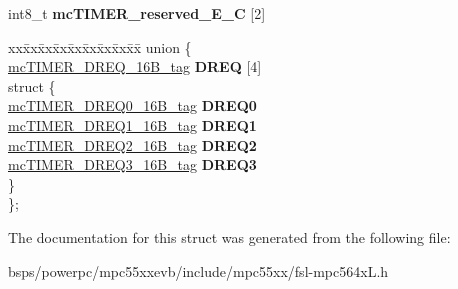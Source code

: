 \begin{DoxyCompactItemize}
\mbox{\label{structmcTIMER__struct__tag_a6c0588932173f1b5d96fb55863447152}} 
int8\+\_\+t {\bfseries mc\+T\+I\+M\+E\+R\+\_\+reserved\+\_\+E\+\_\+C} \mbox{[}2\mbox{]}
\item 
\mbox{\label{structmcTIMER__struct__tag_a896207dceb1e4c73c65fa0398d6e10de}} 
\begin{tabbing}
xx\=xx\=xx\=xx\=xx\=xx\=xx\=xx\=xx\=\kill
union \{\\
\>\mbox{\hyperlink{unionmcTIMER__DREQ__16B__tag}{mcTIMER\_DREQ\_16B\_tag}} {\bfseries DREQ} \mbox{[}4\mbox{]}\\
\mbox{\label{unionmcTIMER__struct__tag_1_1_0D1944_a1cc2000cab2597ad21b44970b5eece90}} 
\>struct \{\\
\>\>\mbox{\hyperlink{unionmcTIMER__DREQ0__16B__tag}{mcTIMER\_DREQ0\_16B\_tag}} {\bfseries DREQ0}\\
\>\>\mbox{\hyperlink{unionmcTIMER__DREQ1__16B__tag}{mcTIMER\_DREQ1\_16B\_tag}} {\bfseries DREQ1}\\
\>\>\mbox{\hyperlink{unionmcTIMER__DREQ2__16B__tag}{mcTIMER\_DREQ2\_16B\_tag}} {\bfseries DREQ2}\\
\>\>\mbox{\hyperlink{unionmcTIMER__DREQ3__16B__tag}{mcTIMER\_DREQ3\_16B\_tag}} {\bfseries DREQ3}\\
\>\} \\
\}; \\

\end{tabbing}\end{DoxyCompactItemize}


The documentation for this struct was generated from the following file\+:\begin{DoxyCompactItemize}
\item 
bsps/powerpc/mpc55xxevb/include/mpc55xx/fsl-\/mpc564x\+L.\+h\end{DoxyCompactItemize}
